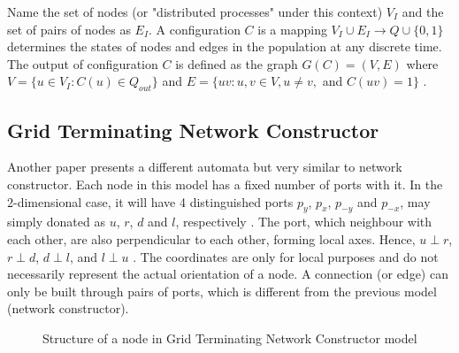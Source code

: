 \par\noindent
Name the set of nodes (or "distributed processes" under this context) $V_{I}$ and the set of pairs of nodes as $E_{I}$.
A configuration $C$ is a mapping $ V_{I} \cup E_{I} \to Q \cup \{0,1\} $ determines the states of nodes and edges in the population at any discrete time.
The output of configuration $C$ is defined as the graph $G(C) = (V, E) $ where $V = \{u \in V_{I}: C(u) \in Q_{out}\}$
and  $E = \{uv: u, v \in V, u \not= v,$ and $C(uv) = 1\}$ \cite{MS16a}.



\subsection{Grid Terminating Network Constructor \cite{Mi17} \label{IntroToGrid}}

\par\noindent
Another paper \cite{Mi17} presents a different automata but very similar to network constructor. Each node in this
model has a fixed number of ports with it. In the 2-dimensional case, it will have 4 distinguished ports
$p_{y}$, $p_{x}$, $p_{-y}$ and $p_{-x}$, may simply donated as $u$, $r$, $d$ and $l$, respectively \cite{Mi17} .
The port, which neighbour with each other, are also perpendicular to each other, forming local axes. Hence,
$ u \perp r $, $ r \perp d $, $ d \perp l $, and  $ l \perp u $ \cite{Mi17} . The coordinates are only for local purposes and
do not necessarily represent the actual orientation of a node. A connection (or edge) can only be built through
pairs of ports, which is different from the previous model (network constructor).


\par\noindent
\begin{figure}[H]
\begin{center}
\end{center}
\caption{Structure of a node in Grid Terminating Network Constructor model}
\end{figure}


\par\noindent

